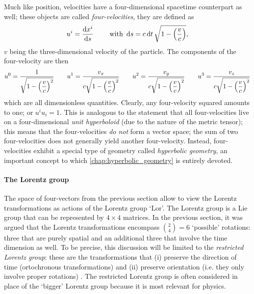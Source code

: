Much like position, velocities have a four-dimensional spacetime counterpart as well; these objects are called \emph{four-velocities}, they are defined as \cite{Landau1971}
\[ u^i = \dv{x^i}{s} \qquad \text{ with } \dd{s} = c\dd{t} \sqrt{1 - \qty(\frac{v}{c})},\]
\(v\) being the three-dimensional velocity of the particle. The components of the four-velocity are then
\[ 
u^0 = \frac{\displaystyle 1}{\displaystyle \sqrt{1 - \qty(\frac{v}{c})^2}} 
\qquad  u^1 = \frac{\displaystyle v_x}{\displaystyle c\sqrt{1 - \qty(\frac{v}{c})^2}}
\qquad  u^2 = \frac{\displaystyle v_y}{\displaystyle c\sqrt{1 - \qty(\frac{v}{c})^2}}
\qquad  u^3 = \frac{\displaystyle v_z}{\displaystyle c\sqrt{1 - \qty(\frac{v}{c})^2}}
\]
which are all dimensionless quantities. Clearly, any four-velocity squared amounts to one; or \(u^i u_i = 1\). This is analogous to the statement that all four-velocities live on a four-dimensional \emph{unit hyperboloid} (due to the nature of the metric tensor); this means that the four-velocities \emph{do not} form a vector space; the sum of two four-velocities does not generally yield another four-velocity. Instead, four-velocities exhibit a special type of geometry called \emph{hyperbolic geometry}, an important concept to which \cref{chap:hyperbolic_geometry} is entirely devoted.

\paragraph{The Lorentz group} The space of four-vectors from the previous section allow to view the Lorentz transformations as actions of the Lorentz group `$\text{Lor}$'. The Lorentz group is a Lie group that can be represented by $4\times4$ matrices. In the previous section, it was argued that the Lorentz transformations encompass $\binom{2}{4} = 6$ `possible' rotations: three that are purely spatial and an additional three that involve the time dimension as well. To be precise, this discussion will be limited to the \emph{restricted Lorentz group}: these are the transformations that (i) preserve the direction of time (ortochronous transformations) and (ii) preserve orientation (i.e. they only involve proper rotations) \cite{Tung1985}. The restricted Lorentz group is often considered in place of the `bigger' Lorentz group because it is most relevant for physics.

